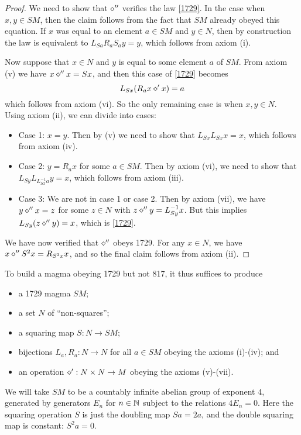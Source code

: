 \begin{proof}  We need to show that $\diamond''$ verifies the law \eqref{1729}.  In the case when $x,y \in SM$, then the claim follows from the fact that $SM$ already obeyed this equation.  If $x$ was equal to an element $a \in SM$ and $y \in N$, then by construction the law is equivalent to $L_{Sa} R_a S_a y = y$, which follows from axiom (i).

Now suppose that $x \in N$ and $y$ is equal to some element $a$ of $SM$.  From axiom (v) we have $x \diamond'' x = Sx$, and then this case of \eqref{1729} becomes
$$L_{Sx} ( R_a x \diamond' x ) = a$$
which follows from axiom (vi).  So the only remaining case is when $x,y \in N$.  Using axiom (ii), we can divide into cases:
\begin{itemize}
\item Case 1: $x=y$.  Then by (v) we need to show that $L_{Sx} L_{Sx} x = x$, which follows from axiom (iv).
\item Case 2: $y = R_a x$ for some $a \in SM$.  Then by axiom (vi), we need to show that $L_{Sy} L_{L_{Sx}^{-1} a} y = x$, which follows from axiom (iii).
\item Case 3: We are not in case 1 or case 2.  Then by axiom (vii), we have $y \diamond'' x = z$ for some $z \in N$ with $z \diamond'' y = L_{Sy}^{-1} x$.  But this implies $L_{Sy} (z \diamond'' y) = x$, which is \eqref{1729}.
\end{itemize}

We have now verified that $\diamond''$ obeys 1729.  For any $x \in N$, we have $x \diamond'' S^2 x = R_{S^2 x} x$, and so the final claim follows from axiom (ii).
\end{proof}

To build a magma obeying 1729 but not 817, it thus suffices to produce
\begin{itemize}
  \item a 1729 magma $SM$;
  \item a set $N$ of ``non-squares'';
  \item a squaring map $S: N \to SM$;
  \item bijections $L_a, R_a: N \to N$ for all $a \in SM$ obeying the axioms (i)-(iv); and
  \item an operation $\diamond': N \times N \to M$ obeying the axioms (v)-(vii).
\end{itemize}

We will take $SM$ to be a countably infinite abelian group of exponent $4$, generated by generators $E_n$ for $n \in \mathbb{N}$ subject to the relations $4E_n=0$.   Here the squaring operation $S$ is just the doubling map $Sa = 2a$, and the double squaring map is constant: $S^2 a = 0$.


